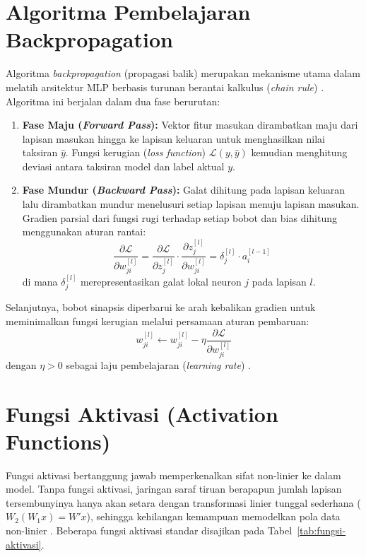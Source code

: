 \documentclass[a4paper,oneside,12pt]{report}
\begin{document}
\section{Algoritma Pembelajaran Backpropagation}
Algoritma \textit{backpropagation} (propagasi balik) merupakan mekanisme utama dalam melatih arsitektur MLP berbasis turunan berantai kalkulus (\textit{chain rule}) \cite{goodfellow2016}. Algoritma ini berjalan dalam dua fase berurutan:
\begin{enumerate}[noitemsep, topsep=2pt, parsep=1pt]
	\item \textbf{Fase Maju (\textit{Forward Pass}):} Vektor fitur masukan dirambatkan maju dari lapisan masukan hingga ke lapisan keluaran untuk menghasilkan nilai taksiran $\hat{y}$. Fungsi kerugian (\textit{loss function}) $\mathcal{L}(y, \hat{y})$ kemudian menghitung deviasi antara taksiran model dan label aktual $y$.
	\item \textbf{Fase Mundur (\textit{Backward Pass}):} Galat dihitung pada lapisan keluaran lalu dirambatkan mundur menelusuri setiap lapisan menuju lapisan masukan. Gradien parsial dari fungsi rugi terhadap setiap bobot dan bias dihitung menggunakan aturan rantai:
	      \begin{equation}
		      \frac{\partial \mathcal{L}}{\partial w_{ji}^{[l]}} = \frac{\partial \mathcal{L}}{\partial z_j^{[l]}} \cdot \frac{\partial z_j^{[l]}}{\partial w_{ji}^{[l]}} = \delta_j^{[l]} \cdot a_i^{[l-1]}
	      \end{equation}
	      di mana $\delta_j^{[l]}$ merepresentasikan galat lokal neuron $j$ pada lapisan $l$.
\end{enumerate}

Selanjutnya, bobot sinapsis diperbarui ke arah kebalikan gradien untuk meminimalkan fungsi kerugian melalui persamaan aturan pembaruan:
\begin{equation}
	w_{ji}^{[l]} \leftarrow w_{ji}^{[l]} - \eta \frac{\partial \mathcal{L}}{\partial w_{ji}^{[l]}}
\end{equation}
dengan $\eta > 0$ sebagai laju pembelajaran (\textit{learning rate}) \cite{haykin2009}.

\section{Fungsi Aktivasi (Activation Functions)}
Fungsi aktivasi bertanggung jawab memperkenalkan sifat non-linier ke dalam model. Tanpa fungsi aktivasi, jaringan saraf tiruan berapapun jumlah lapisan tersembunyinya hanya akan setara dengan transformasi linier tunggal sederhana ($W_2(W_1 x) = W' x$), sehingga kehilangan kemampuan memodelkan pola data non-linier \cite{nielsen2015}. Beberapa fungsi aktivasi standar disajikan pada Tabel~\ref{tab:fungsi-aktivasi}.
\end{document}
